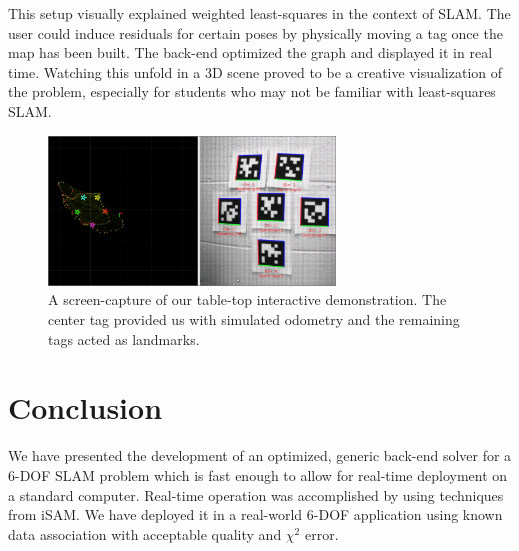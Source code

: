 \documentclass[conference]{IEEEtran}
\begin{document}
This setup visually explained weighted least-squares in the context of \ac{SLAM}.  The
user could induce residuals for certain poses by physically moving a tag once the map has
been built.  The back-end optimized the graph and displayed it in real time.  Watching this
unfold in a 3D scene proved to be a creative visualization of the problem,
especially for students who may not be familiar with least-squares SLAM.

\begin{figure}[h]
  \centering
  \includegraphics[width=3.0in]{images/interactiveDemo}
  \caption{A screen-capture of our table-top interactive
    demonstration.  The center tag provided us with simulated odometry
  and the remaining tags acted as landmarks.}
  \label{fig:interactiveDemo}
\end{figure}

\section{Conclusion}
\label{sec:conclusion}

We have presented the development of an optimized, generic back-end solver for a 6-\ac{DOF}
\ac{SLAM} problem which is fast enough to allow for real-time deployment on a standard
computer.  Real-time operation was accomplished by using techniques from iSAM. We have 
deployed it in a real-world 6-\ac{DOF} application using known data
association with acceptable quality and $\chi^2$ error.




\end{document}
